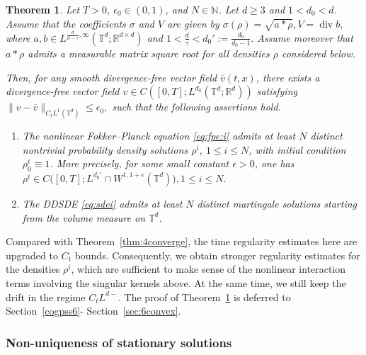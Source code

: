 \documentclass[10pt,a4paper]{amsart}
\numberwithin{equation}{section}
\newtheorem{theorem}{Theorem}[section]
\def\geq{\geqslant}
\def\leq{\leqslant}
\def\bt{\begin{theorem}}
\def\et{\end{theorem}}
\def\geq{\geqslant}
\def\leq{\leqslant}
\begin{document}
\bt\label{thm:6converge}
Let $T>0$, $\epsilon_0\in(0,1)$, and $N\in\mathbb{N}$. Let $d\geq 3$ and
$1<d_0<d$. Assume that the coefficients $\sigma$ and $V$ are given by
$\sigma(\rho)=\sqrt{a*\rho},
V=\operatorname{div} b,$
where $a,b\in L^{\frac{d}{d-\gamma},\infty}
(\mathbb{T}^d;\mathbb{R}^{d\times d})$ and
$
1<\frac{d}{\gamma}<d_0':=\frac{d_0}{d_0-1}.
$  
Assume moreover that $a*\rho$ admits a measurable matrix square root for all
densities $\rho$ considered below.

Then, for any smooth divergence-free vector field
$\overline v(t,x)$, there exists a   divergence-free
vector field
$
v\in C ([0,T];L^{d_0}(\mathbb{T}^d;\mathbb{R}^d) )
$
satisfying $\|v-\overline v\|_{C_tL^1(\mathbb{T}^d)}
\leq \epsilon_0, $ 
such that the following assertions hold.

\begin{enumerate}
\item
The nonlinear Fokker--Planck equation \eqref{eq:fpe:i} admits at least $N$
distinct nontrivial probability density solutions $\rho^i$, $1\leq i\leq N$,
with initial condition $\rho^i_0\equiv 1$. More precisely, for some
small constant $\epsilon>0$, one has
$
\rho^i
\in
C\bigl([0,T];L^{d_0'}\cap W^{1,1+\epsilon}(\mathbb{T}^d)\bigr),
1\leq i\leq N .
$

\item
The DDSDE \eqref{eq:sdei} admits at least $N$ distinct martingale solutions
starting from the  volume measure on $\mathbb{T}^d$.
\end{enumerate}
\et

Compared with Theorem~\ref{thm:4converge}, the time regularity estimates here
are upgraded to $C_t$ bounds. Consequently, we obtain stronger regularity
estimates for the densities $\rho^i$, which are sufficient to make sense of
the nonlinear interaction terms involving the singular kernels above. At the same time, we still keep the drift in the 
regime $C_tL^{d-}$. The
proof of Theorem~\ref{thm:6converge} is deferred to
Section~\ref{cogpss6}- Section~\ref{sec:6convex}.

 

\subsubsection{Non-uniqueness of stationary solutions}
\end{document}
